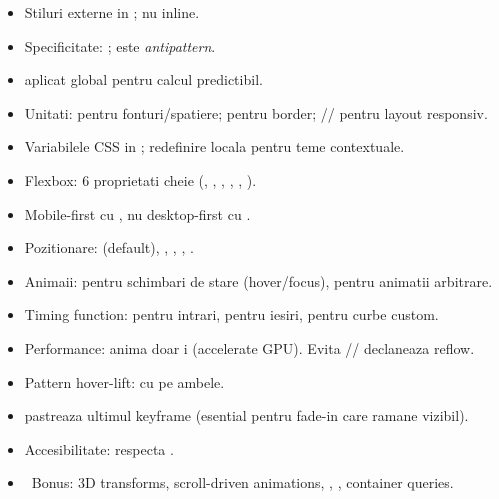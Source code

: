 \begin{recap}
\begin{itemize}[itemsep=1pt]
  \item Stiluri externe in ; nu inline.
  \item Specificitate: ;  este \emph{antipattern}.
  \item {} aplicat global pentru calcul predictibil.
  \item Unitati:  pentru fonturi/spatiere;  pentru border; \code{\%}// pentru layout responsiv.
  \item Variabilele CSS in ; redefinire locala pentru teme contextuale.
  \item Flexbox: 6 proprietati cheie (, , , , , ).
  \item Mobile-first cu , nu desktop-first cu .
  \item Pozitionare:  (default), , , , .
  \item Animaii:  pentru schimbari de stare (hover/focus),  pentru animatii arbitrare.
  \item Timing function:  pentru intrari,  pentru iesiri,  pentru curbe custom.
  \item Performance: anima doar  i  (accelerate GPU). Evita // \textendash{} declaneaza reflow.
  \item Pattern hover-lift:  cu  pe ambele.
  \item {} pastreaza ultimul keyframe (esential pentru fade-in care ramane vizibil).
  \item Accesibilitate: respecta .
  \item \faRocket\ Bonus: 3D transforms, scroll-driven animations, , , container queries.
\end{itemize}
\end{recap}

\partdivider

